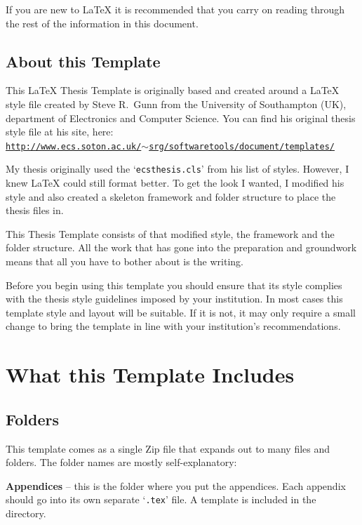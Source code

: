 If you are new to \LaTeX{} it is recommended that you carry on reading through the rest of the information in this document.

\subsection{About this Template}

This \LaTeX{} Thesis Template is originally based and created around a \LaTeX{} style file created by Steve R.\ Gunn from the University of Southampton (UK), department of Electronics and Computer Science. You can find his original thesis style file at his site, here:\\
\href{http://www.ecs.soton.ac.uk/~srg/softwaretools/document/templates/}{\texttt{http://www.ecs.soton.ac.uk/$\sim$srg/softwaretools/document/templates/}}

My thesis originally used the `\texttt{ecsthesis.cls}' from his list of styles. However, I knew \LaTeX{} could still format better. To get the look I wanted, I modified his style and also created a skeleton framework and folder structure to place the thesis files in.

This Thesis Template consists of that modified style, the framework and the folder structure. All the work that has gone into the preparation and groundwork means that all you have to bother about is the writing.

Before you begin using this template you should ensure that its style complies with the thesis style guidelines imposed by your institution. In most cases this template style and layout will be suitable. If it is not, it may only require a small change to bring the template in line with your institution's recommendations.


\section{What this Template Includes}

\subsection{Folders}

This template comes as a single Zip file that expands out to many files and folders. The folder names are mostly self-explanatory:

\textbf{Appendices} -- this is the folder where you put the appendices. Each appendix should go into its own separate `\texttt{.tex}' file. A template is included in the directory.

